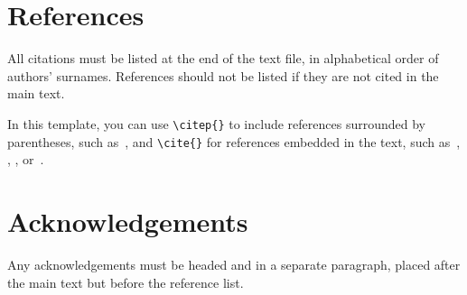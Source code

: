 \documentclass{article}
\begin{document}
\section{References}

All citations must be listed at the end of the text file,
in alphabetical order of authors' surnames.
References should not be listed if they are not cited in
the main text.

In this template, you can use \verb=\citep{}= to include references surrounded by parentheses, such as~\citep{KneesS16_MusicSimilarityRetrieval_SPRINGER}, and \verb=\cite{}=
for references embedded in the text,
such as~\cite{WeihsJVR16_MusicDataAnalysis_CRC},
\cite{SerraEtAl13_RoadmapMIR_CreativeCommon},
\cite{Lerch15_AudioContentAnalysis_WILEY},
or~\cite{Mueller15_FMP_SPRINGER}.
%
%
\section*{Acknowledgements}

Any acknowledgements must be headed and in a separate paragraph, placed after the main text but before the reference list.
%
%

%
%
%
%
%
%
\end{document}
